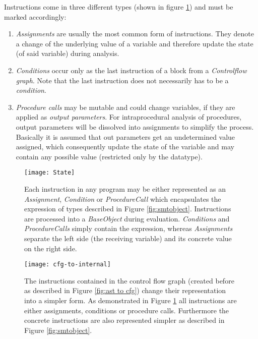 Instructions come in three different types (shown in figure \ref{fig:state}) and must be marked accordingly:
\begin{enumerate}
	\item \emph{Assignments} are usually the most common form of instructions. They denote a change of the underlying value of a variable and therefore update the state (of said variable) during analysis. 
	\item \emph{Conditions} occur only as the last instruction of a block from a \emph{Controlflow graph}. Note that the last instruction does not necessarily has to be a \emph{condition}.
	\item \emph{Procedure calls} may be mutable and could change variables, if they are applied as \emph{output parameters}. %
	For intraprocedural analysis of procedures, output parameters will be dissolved into assignments to simplify the process. Basically it is assumed that out parameters get an undetermined value assigned, which consequently update the state of the variable and may contain any possible value (restricted only by the datatype).
\end{enumerate}
\begin{figure}[h!]
	\centering
	\texttt{[image: State]}
	\caption{Each instruction in any program may be either represented as an \emph{Assignment}, \emph{Condition} or \emph{ProcedureCall} which encapsulates the expression of types described in Figure \ref{fig:smtobject}. Instructions are processed into a \emph{BaseObject} during evaluation. \emph{Conditions} and \emph{ProcedureCalls} simply contain the expression, whereas \emph{Assignments} separate the left side (the receiving variable) and its concrete value on the right side.}
	\label{fig:state}
\end{figure}
\begin{figure}[h!]
	\centering
	\texttt{[image: cfg-to-internal]}
	\caption{The instructions contained in the control flow graph (created before as described in Figure \ref{fig:ast to cfg}) change their representation into a simpler form. As demonstrated in Figure \ref{fig:state} all instructions are either assignments, conditions or procedure calls. Furthermore the concrete instructions are also represented simpler as described in Figure \ref{fig:smtobject}. }
	\label{fig:cfg to internal}
\end{figure}

